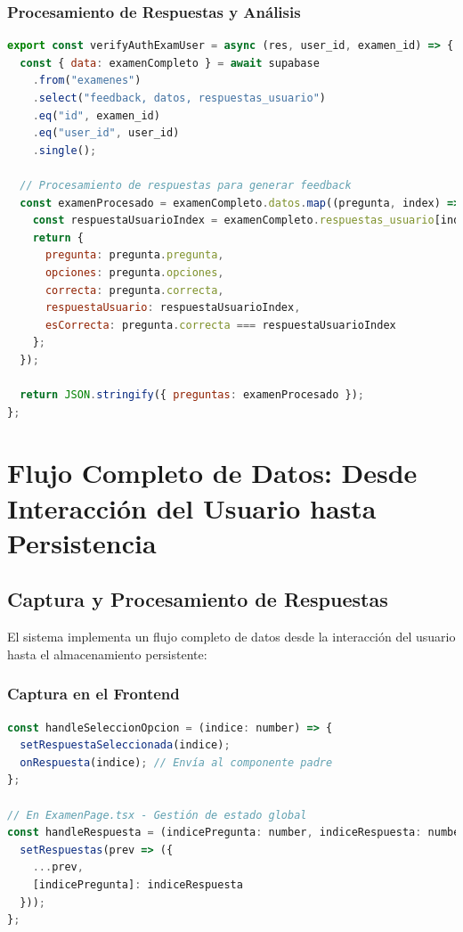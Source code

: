\documentclass[12pt,a4paper]{report}
\begin{document}
\subsubsection{Procesamiento de Respuestas y Análisis}

\begin{lstlisting}[language=JavaScript, caption=Función de verificación y procesamiento]
export const verifyAuthExamUser = async (res, user_id, examen_id) => {
  const { data: examenCompleto } = await supabase
    .from("examenes")
    .select("feedback, datos, respuestas_usuario")
    .eq("id", examen_id)
    .eq("user_id", user_id)
    .single();

  // Procesamiento de respuestas para generar feedback
  const examenProcesado = examenCompleto.datos.map((pregunta, index) => {
    const respuestaUsuarioIndex = examenCompleto.respuestas_usuario[index];
    return {
      pregunta: pregunta.pregunta,
      opciones: pregunta.opciones,
      correcta: pregunta.correcta,
      respuestaUsuario: respuestaUsuarioIndex,
      esCorrecta: pregunta.correcta === respuestaUsuarioIndex
    };
  });

  return JSON.stringify({ preguntas: examenProcesado });
};
\end{lstlisting}

\section{Flujo Completo de Datos: Desde Interacción del Usuario hasta Persistencia}

\subsection{Captura y Procesamiento de Respuestas}

El sistema implementa un flujo completo de datos desde la interacción del usuario hasta el almacenamiento persistente:

\subsubsection{Captura en el Frontend}

\begin{lstlisting}[language=JavaScript, caption=Captura de respuestas en PreguntaCard.tsx]
const handleSeleccionOpcion = (indice: number) => {
  setRespuestaSeleccionada(indice);
  onRespuesta(indice); // Envía al componente padre
};

// En ExamenPage.tsx - Gestión de estado global
const handleRespuesta = (indicePregunta: number, indiceRespuesta: number) => {
  setRespuestas(prev => ({
    ...prev,
    [indicePregunta]: indiceRespuesta
  }));
};
\end{lstlisting}
\end{document}
